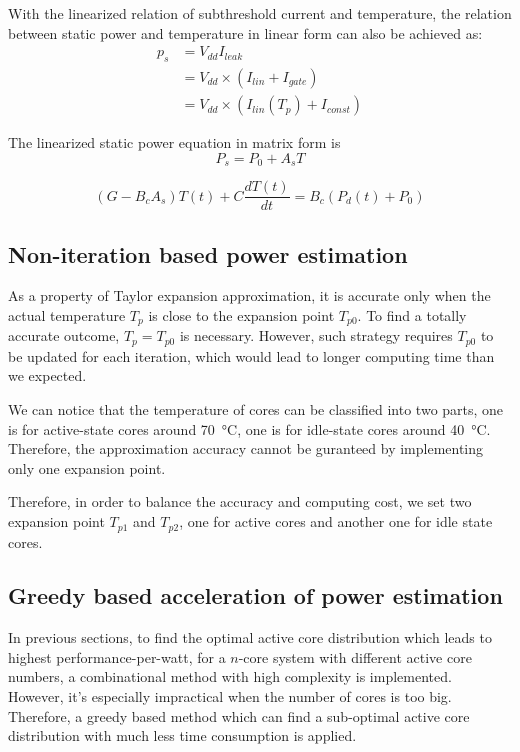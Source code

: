 With the linearized relation of subthreshold current and temperature, the relation between static power and temperature in linear form can also be achieved as:
\begin{equation}\label{linear_static}
\begin{split}
p_{s} &= V_{dd}I_{leak}\\
&= V_{dd} \times (I_{lin}+I_{gate})\\
&= V_{dd} \times (I_{lin}(T_{p})+I_{const})
\end{split}
\end{equation}


The linearized static power equation in matrix form is
\begin{equation}\label{linear_static_matrix}
P_{s} = P_{0}+A_{s}T
\end{equation}

\begin{equation}\label{gt=bp}
(G - B_{c}A_{s})T(t) + C\frac{dT(t)}{dt} = B_{c}(P_{d}(t) + P_{0})
\end{equation}

\subsection{Non-iteration based power estimation}
As a property of Taylor expansion approximation, it is accurate only when the actual temperature $T_{p}$ is close to the expansion point $T_{p0}$. To find a totally accurate outcome, $T_{p} = T_{p0}$ is necessary. However, such strategy requires $T_{p0}$ to be updated for each iteration, which would lead to longer computing time than we expected. 

We can notice that the temperature of cores can be classified into two parts, one is for active-state cores around \SI{70}{\degreeCelsius}, one is for idle-state cores around \SI{40}{\degreeCelsius}. Therefore, the approximation accuracy cannot be guranteed by implementing only one expansion point. 

Therefore, in order to balance the accuracy and computing cost, we set two expansion point $T_{p1}$ and $T_{p2}$, one for active cores and another one for idle state cores.


\subsection{Greedy based acceleration of power estimation}
In previous sections, to find the optimal active core distribution which leads to highest performance-per-watt, for a $n$-core system with different active core numbers,  a combinational method with high complexity is implemented. However, it's  especially impractical when the number of cores is too big. Therefore, a greedy based method which can find a sub-optimal active core distribution with much less time consumption is applied.


